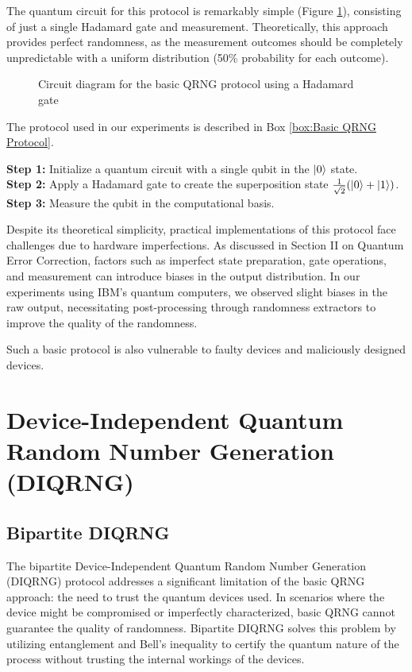 \documentclass[lettersize,journal]{IEEEtran}
\begin{document}
The quantum circuit for this protocol is remarkably simple (Figure \ref{fig:basic_qrng_circuit}), consisting of just a single Hadamard gate and measurement. Theoretically, this approach provides perfect randomness, as the measurement outcomes should be completely unpredictable with a uniform distribution (50\% probability for each outcome).

\begin{figure}
    \centering
    \caption{Circuit diagram for the basic QRNG protocol using a Hadamard gate}
    \label{fig:basic_qrng_circuit}
\end{figure}

The protocol used in our experiments is described in Box \ref{box:Basic QRNG Protocol}.

\begin{tcolorbox}[width=8cm, height=6cm, colback=gray!10, colframe=gray!70, title= Basic QRNG Protocol]
    \textbf{Step 1:} Initialize a quantum circuit with a single qubit in the $\ket{0}$ state. \\
    \textbf{Step 2:} Apply a Hadamard gate to create the superposition state $\frac{1}{\sqrt{2}}(\ket{0} + \ket{1})$. \\
    \textbf{Step 3:} Measure the qubit in the computational basis.
    \label{box:Basic QRNG Protocol}
\end{tcolorbox}

Despite its theoretical simplicity, practical implementations of this protocol face challenges due to hardware imperfections. As discussed in Section II on Quantum Error Correction, factors such as imperfect state preparation, gate operations, and measurement can introduce biases in the output distribution. In our experiments using IBM's quantum computers, we observed slight biases in the raw output, necessitating post-processing through randomness extractors to improve the quality of the randomness.

Such a basic protocol is also vulnerable to faulty devices and maliciously designed devices.

\section{Device-Independent Quantum Random Number Generation (DIQRNG)}
\subsection{Bipartite DIQRNG}
The bipartite Device-Independent Quantum Random Number Generation (DIQRNG) protocol addresses a significant limitation of the basic QRNG approach: the need to trust the quantum devices used. In scenarios where the device might be compromised or imperfectly characterized, basic QRNG cannot guarantee the quality of randomness. Bipartite DIQRNG solves this problem by utilizing entanglement and Bell's inequality to certify the quantum nature of the process without trusting the internal workings of the devices.
\end{document}
